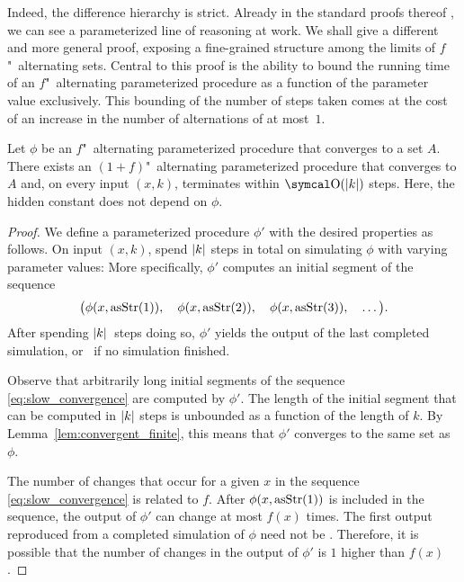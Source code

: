 Indeed, the difference hierarchy is strict.
Already in the standard proofs thereof \parencite{arslanov1997degree,ershov1968hierarchyi,putnam1965trial}, we can see a parameterized line of reasoning at work.
We shall give a different and more general proof, exposing a fine-grained structure among the limits of $f$"~alternating sets.
Central to this proof is the ability to bound the running time of an $f$"~alternating parameterized procedure as a function of the parameter value exclusively.
This bounding of the number of steps taken comes at the cost of an increase in the number of alternations of at most~$1$.
\begin{theorem}
\label{thm:slow_convergence}%
  Let $\phi$ be an $f$"~alternating parameterized procedure that converges to a set $A$.
  There exists an $(1 + f)$"~alternating parameterized procedure that converges to $A$ and, on every input $(x, k)$, terminates within $\bigO(\length{k})$ steps.
  Here, the hidden constant does not depend on $\phi$.
\end{theorem}
\begin{proof}
  We define a parameterized procedure $\phi'$ with the desired properties as follows.
  On input $(x, k)$, spend ${\lvert k\rvert}$ steps in total on simulating $\phi$ with varying parameter values:
  More specifically, $\phi'$ computes an initial segment of the sequence
  \begin{equation}
  \label{eq:slow_convergence}
    \big(\phi(x, \operatorname{asStr}(1)),\quad \phi(x, \operatorname{asStr}(2)),\quad \phi(x, \operatorname{asStr}(3)), \quad \ldots\big).
  \end{equation}
  After spending ${\lvert k\rvert}$~steps doing so, $\phi'$ yields the output of the last completed simulation, or~ if no simulation finished.

  Observe that arbitrarily long initial segments of the sequence \eqref{eq:slow_convergence} are computed by $\phi'$.
  The length of the initial segment that can be computed in ${\lvert k\rvert}$ steps is unbounded as a function of the length of $k$.
  By Lemma~\ref{lem:convergent_finite}, this means that $\phi'$ converges to the same set as $\phi$.

  The number of changes that occur for a given $x$ in the sequence \eqref{eq:slow_convergence} is related to $f$.
  After $\phi(x, \operatorname{asStr}(1))$ is included in the sequence, the output of $\phi'$ can change at most $f(x)$ times.
  The first output reproduced from a completed simulation of $\phi$ need not be .
  Therefore, it is possible that the number of changes in the output of $\phi'$ is $1$ higher than $f(x)$.
\end{proof}

